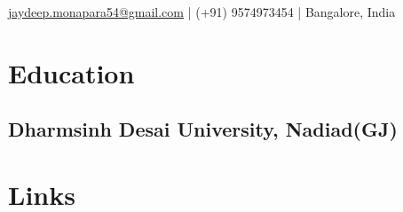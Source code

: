 \documentclass[]{jaydeep-resume-openfont}
\begin{document}
%
%
\lastupdated

%
%
{ \href{mailto:jaydeep.monapara54@gmail.com}{jaydeep.monapara54@gmail.com} | (+91) 9574973454 | Bangalore, India}

%
%

\begin{minipage}[t]{0.29\textwidth}


\section{Education}

\subsection{Dharmsinh Desai \newline University, Nadiad(GJ)}
\sectionsep




\section{Links}


\end{minipage}
\end{document}
